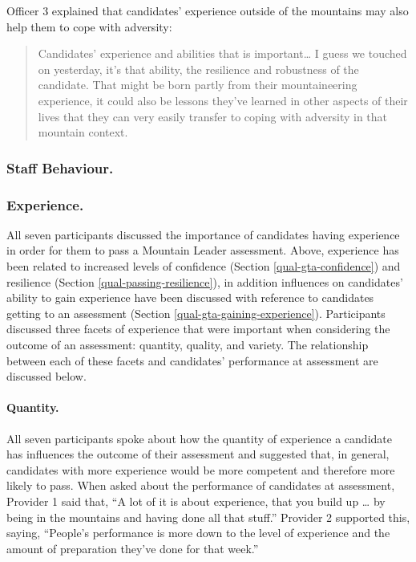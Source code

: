\documentclass[
  12pt,
  a4paper,
]{book}
\begin{document}
Officer 3 explained that candidates' experience outside of the mountains may also help them to cope with adversity:

\begin{quote}
Candidates' experience and abilities that is important\ldots{} I guess we touched on yesterday, it's that ability, the resilience and robustness of the candidate. That might be born partly from their mountaineering experience, it could also be lessons they've learned in other aspects of their lives that they can very easily transfer to coping with adversity in that mountain context.
\end{quote}

\hypertarget{staff-behaviour.}{%
\subsubsection{Staff Behaviour.}\label{staff-behaviour.}}

\hypertarget{ml-qual-pass-exp}{%
\subsubsection{Experience.}\label{ml-qual-pass-exp}}

All seven participants discussed the importance of candidates having experience in order for them to pass a Mountain Leader assessment. Above, experience has been related to increased levels of confidence (Section \ref{qual-gta-confidence}) and resilience (Section \ref{qual-passing-resilience}), in addition influences on candidates' ability to gain experience have been discussed with reference to candidates getting to an assessment (Section \ref{qual-gta-gaining-experience}). Participants discussed three facets of experience that were important when considering the outcome of an assessment: quantity, quality, and variety. The relationship between each of these facets and candidates' performance at assessment are discussed below.

\hypertarget{quantity.}{%
\paragraph{Quantity.}\label{quantity.}}

All seven participants spoke about how the quantity of experience a candidate has influences the outcome of their assessment and suggested that, in general, candidates with more experience would be more competent and therefore more likely to pass. When asked about the performance of candidates at assessment, Provider 1 said that, ``A lot of it is about experience, that you build up \ldots{} by being in the mountains and having done all that stuff.'' Provider 2 supported this, saying, ``People's performance is more down to the level of experience and the amount of preparation they've done for that week.''
\end{document}
